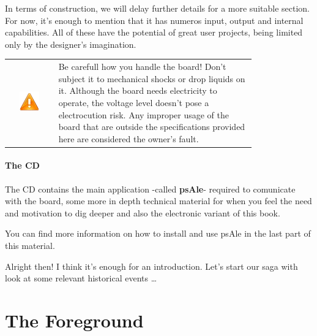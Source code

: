 \documentclass[12pt, a4paper]{book}
\newcommand{\InsertImportantMark}[1]{
  \renewcommand{\arraystretch}{2.4}
  \begin{tabular}{c m{0.8\linewidth} }
    \begin{minipage}[c][2cm][c]{0.1\textwidth}
      \includegraphics[scale=1.0]{./img/altele/important_marker.png} 
    \end{minipage}
    &
    #1
  \end{tabular}
  \renewcommand{\arraystretch}{1}
}
\begin{document}
In terms of construction, we will delay further details for a more suitable section. For now, it's enough to mention that it has numeros input, output and internal capabilities. All of these have the potential of great user projects, being limited only by the designer's imagination.

\InsertImportantMark{
  Be carefull how you handle the board! Don't subject it to mechanical shocks or drop liquids on it. Although the board needs electricity to operate, the voltage level doesn't pose a electrocution risk. Any improper usage of the board that are outside the specifications provided here are considered the owner's fault.
}

\subsection{The CD}

The CD contains the main application -called \textbf{psAle}- required to comunicate with the board, some more in depth technical material for when you feel the need and motivation to dig deeper and also the electronic variant of this book.

You can find more information on how to install and use psAle in the last part of this material.

Alright then! I think it's enough for an introduction. Let's start our saga with look at some relevant historical events \ldots

\part[The Foreground]{The Foreground\\[2ex]
}
\end{document}

